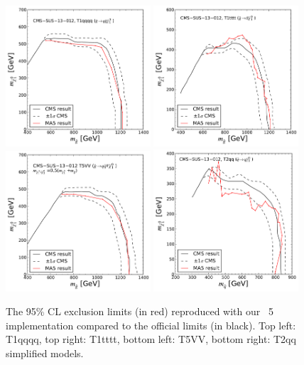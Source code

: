  \begin{figure}
        \centering
        \includegraphics[width=0.48\textwidth]{figures/Appendices/Ma5ValidationSUS13012/cms-012-limit-T1qqqq.pdf}
        \includegraphics[width=0.48\textwidth]{figures/Appendices/Ma5ValidationSUS13012/cms-012-limit-T1tttt.pdf}\\
        \includegraphics[width=0.48\textwidth]{figures/Appendices/Ma5ValidationSUS13012/cms-012-limit-T5VV.pdf}
        \includegraphics[width=0.48\textwidth]{figures/Appendices/Ma5ValidationSUS13012/cms-012-limit-T2qq.pdf}
\caption{The 95\% CL exclusion limits (in red) reproduced with our {}~5 implementation compared to the official limits (in black). Top left: T1qqqq, top right: T1tttt, bottom left: T5VV, bottom right: T2qq simplified models.
\label{fig:limitplots}}
        \end{figure} 

